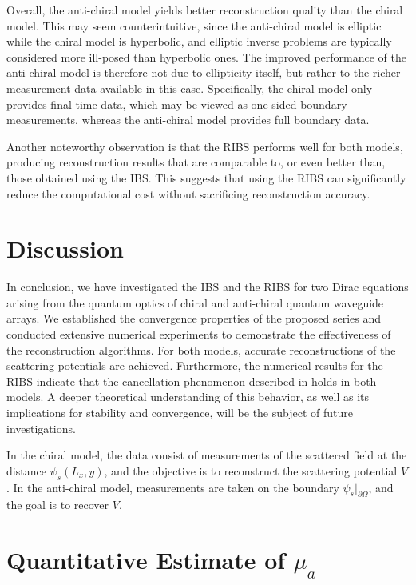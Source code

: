 \documentclass[12pt,reqno]{amsart}
\begin{document}
Overall, the anti-chiral model yields better reconstruction quality than the chiral model.
This may seem counterintuitive, since the anti-chiral model is elliptic while the chiral
model is hyperbolic, and elliptic inverse problems are typically considered more ill-posed
than hyperbolic ones. The improved performance of the anti-chiral model is therefore not
due to ellipticity itself, but rather to the richer measurement data available in this
case. Specifically, the chiral model only provides final-time data, which may be viewed
as one-sided boundary measurements, whereas the anti-chiral model provides full boundary
data.

Another noteworthy observation is that the RIBS performs well for both models, producing reconstruction results that are comparable to, or even better than, those obtained using the IBS.
This suggests that using the RIBS can significantly reduce the computational cost without sacrificing reconstruction accuracy.
\section{Discussion}
In conclusion, we have investigated the IBS and the RIBS for two Dirac equations arising from the quantum optics of chiral and anti-chiral quantum waveguide arrays. We established the convergence properties of the proposed series and conducted extensive numerical experiments to demonstrate the effectiveness of the reconstruction algorithms. For both models, accurate reconstructions of the scattering potentials are achieved. Furthermore, the numerical results for the RIBS indicate that the cancellation phenomenon described in holds in both models. A deeper theoretical understanding of this behavior, as well as its implications for stability and convergence, will be the subject of future investigations.

\appendix
In the chiral model, the data consist of measurements of the scattered field at the distance $\psi_s(L_x,y)$, and the objective is to reconstruct the scattering potential $V$. In the anti-chiral model, measurements are taken on the boundary $\psi_s|_{\partial\Omega}$, and the goal is to recover $V$.

\section{Quantitative Estimate of $\mu_a$}\label{Quantitative Estimate}
\end{document}
